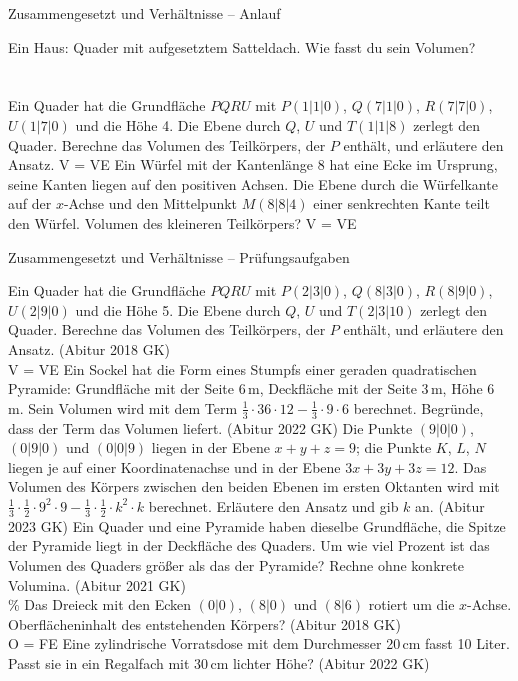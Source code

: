 \begin{aufgabe}{Zusammengesetzt und Verhältnisse – Anlauf}
\begin{teile}
\teil Ein Haus: Quader mit aufgesetztem Satteldach. Wie fasst du sein Volumen? \\  \\  \\ 
\teil Ein Quader hat die Grundfläche $PQRU$ mit $P(1 | 1 | 0)$, $Q(7 | 1 | 0)$, $R(7 | 7 | 0)$, $U(1 | 7 | 0)$ und die Höhe 4. Die Ebene durch $Q$, $U$ und $T(1 | 1 | 8)$ zerlegt den Quader. Berechne das Volumen des Teilkörpers, der $P$ enthält, und erläutere den Ansatz. V = \leerfeld VE
\teil Ein Würfel mit der Kantenlänge 8 hat eine Ecke im Ursprung, seine Kanten liegen auf den positiven Achsen. Die Ebene durch die Würfelkante auf der $x$-Achse und den Mittelpunkt $M(8 | 8 | 4)$ einer senkrechten Kante teilt den Würfel. Volumen des kleineren Teilkörpers? V = \leerfeld VE
\end{teile}
\end{aufgabe}

\begin{aufgabe}{Zusammengesetzt und Verhältnisse – Prüfungsaufgaben}
\begin{teile}
\teil Ein Quader hat die Grundfläche $PQRU$ mit $P(2 | 3 | 0)$, $Q(8 | 3 | 0)$, $R(8 | 9 | 0)$, $U(2 | 9 | 0)$ und die Höhe 5. Die Ebene durch $Q$, $U$ und $T(2 | 3 | 10)$ zerlegt den Quader. Berechne das Volumen des Teilkörpers, der $P$ enthält, und erläutere den Ansatz. \hfill (Abitur 2018 GK) \\ V = \leerfeld VE
\teil Ein Sockel hat die Form eines Stumpfs einer geraden quadratischen Pyramide: Grundfläche mit der Seite 6\,m, Deckfläche mit der Seite 3\,m, Höhe 6\,m. Sein Volumen wird mit dem Term $\tfrac{1}{3} \cdot 36 \cdot 12 - \tfrac{1}{3} \cdot 9 \cdot 6$ berechnet. Begründe, dass der Term das Volumen liefert. \hfill (Abitur 2022 GK)
\teil Die Punkte $(9 | 0 | 0)$, $(0 | 9 | 0)$ und $(0 | 0 | 9)$ liegen in der Ebene $x + y + z = 9$; die Punkte $K$, $L$, $N$ liegen je auf einer Koordinatenachse und in der Ebene $3x + 3y + 3z = 12$. Das Volumen des Körpers zwischen den beiden Ebenen im ersten Oktanten wird mit $\tfrac{1}{3} \cdot \tfrac{1}{2} \cdot 9^2 \cdot 9 - \tfrac{1}{3} \cdot \tfrac{1}{2} \cdot k^2 \cdot k$ berechnet. Erläutere den Ansatz und gib $k$ an. \hfill (Abitur 2023 GK)
\teil Ein Quader und eine Pyramide haben dieselbe Grundfläche, die Spitze der Pyramide liegt in der Deckfläche des Quaders. Um wie viel Prozent ist das Volumen des Quaders größer als das der Pyramide? Rechne ohne konkrete Volumina. \hfill (Abitur 2021 GK) \\ \leerfeld \%
\teil Das Dreieck mit den Ecken $(0 | 0)$, $(8 | 0)$ und $(8 | 6)$ rotiert um die $x$-Achse. Oberflächeninhalt des entstehenden Körpers? \hfill (Abitur 2018 GK) \\ O = \leerfeld FE
\teil Eine zylindrische Vorratsdose mit dem Durchmesser 20\,cm fasst 10 Liter. Passt sie in ein Regalfach mit 30\,cm lichter Höhe? \hfill (Abitur 2022 GK)
\end{teile}
\end{aufgabe}

